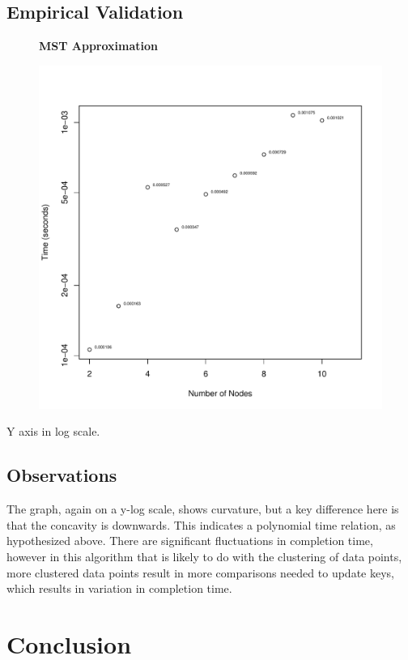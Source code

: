 \documentclass[a4paper,12pt]{article}
\begin{document}
\subsection{Empirical Validation}
\begin{figure}[H]
  \centering
  \textbf{MST Approximation}\par\medskip
  \includegraphics[width=1\linewidth]{MSTApproximation.pdf}
\end{figure}
Y axis in log scale.
\subsection{Observations}
The graph, again on a y-log scale, shows curvature, but a key difference here is that the concavity is downwards. This indicates a polynomial time relation, as hypothesized above. There are significant fluctuations in completion time, however in this algorithm that is likely to do with the clustering of data points, more clustered data points result in more comparisons needed to update keys, which results in variation in completion time.
\section{Conclusion}
\end{document}
